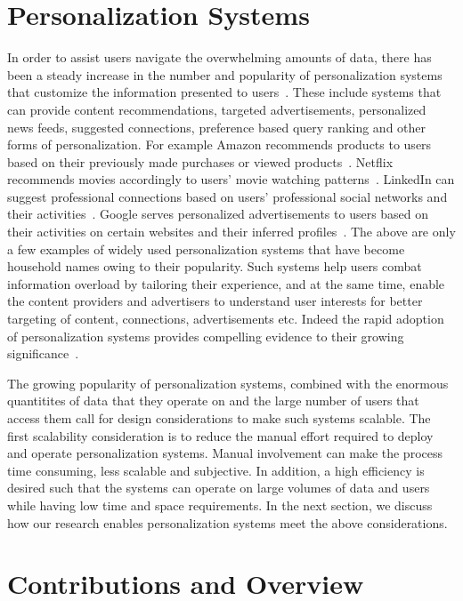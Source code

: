 \documentclass[12pt]{ucsddissertation}
\begin{document}
\section{Personalization Systems}
In order to assist users navigate the overwhelming amounts of data, there has been a steady increase in the number and popularity of personalization systems that customize the information presented to users~\cite{eirinaki2003web}. These include systems that can provide content recommendations, targeted advertisements, personalized news feeds, suggested connections, preference based query ranking and other forms of personalization. For example Amazon recommends products to users based on their previously made purchases or viewed products~\cite{Amazon}. Netflix recommends movies accordingly to users' movie watching patterns~\cite{Netflix}. LinkedIn can suggest professional connections based on users' professional social networks and their activities~\cite{LinkedIn}. Google serves personalized advertisements to users based on their activities on certain websites and their inferred profiles~\cite{Google,castelluccia2012betrayed,GoogleAdsense}. The above are only a few examples of widely used personalization systems that have become household names owing to their popularity. Such systems help users combat information overload by tailoring their experience, and at the same time, enable the content providers and advertisers to understand user interests for better targeting of content, connections, advertisements etc. Indeed the rapid adoption of personalization systems provides compelling evidence to their growing significance~\cite{castellano2009innovations}. 


The growing popularity of personalization systems, combined with the enormous quantitites of data that they operate on and the large number of users that access them call for design considerations to make such systems scalable. The first scalability consideration is to reduce the manual effort required to deploy and operate personalization systems. Manual involvement can make the process time consuming, less scalable and subjective. In addition, a high efficiency is desired such that the systems can operate on large volumes of data and users while having low time and space requirements. In the next section, we discuss how our research enables personalization systems meet the above considerations. 

\section{Contributions and Overview}
\end{document}
